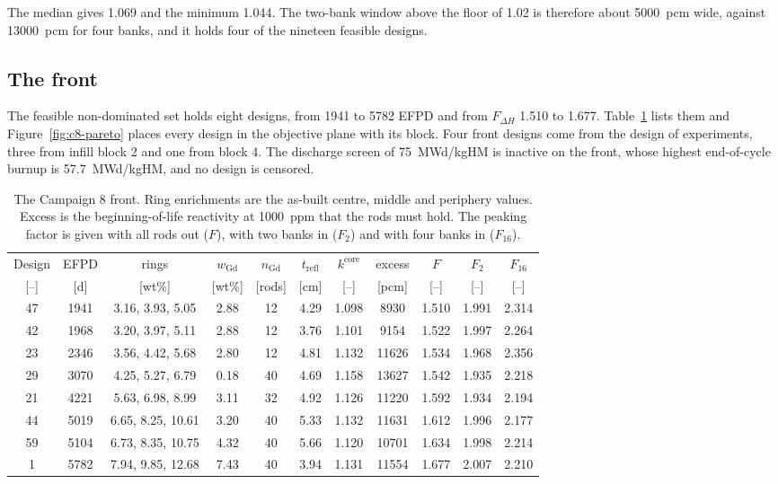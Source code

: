 The median gives 1.069 and the minimum 1.044. The two-bank window
above the floor of 1.02 is therefore about \SI{5000}{pcm} wide, against
\SI{13000}{pcm} for four banks, and it holds four of the nineteen
feasible designs.

\subsection{The front}
\label{sec:res-c8-front}

The feasible non-dominated set holds eight designs, from 1941 to 5782
EFPD and from $F_{\Delta H}$ 1.510 to 1.677. Table~\ref{tab:c8-front}
lists them and Figure~\ref{fig:c8-pareto} places every design in the
objective plane with its block. Four front designs come from the
design of experiments, three from infill block 2 and one from block 4.
The discharge screen of \SI{75}{MWd/kgHM} is inactive on the front,
whose highest end-of-cycle burnup is \SI{57.7}{MWd/kgHM}, and no
design is censored.

\begin{table}[htbp]
  \centering
  \small
  \caption[The Campaign 8 front]{The Campaign 8 front. Ring
  enrichments are the as-built centre, middle and periphery values.
  Excess is the beginning-of-life reactivity at \SI{1000}{ppm} that
  the rods must hold. The peaking factor is given with all rods out
  ($F$), with two banks in ($F_2$) and with four banks in ($F_{16}$).}
  \label{tab:c8-front}
  \setlength{\tabcolsep}{3.4pt}
  \begin{tabular}{ccccccccccc}
    \toprule
    Design & EFPD & rings & $w_\mathrm{Gd}$ & $n_\mathrm{Gd}$ &
      $t_\mathrm{refl}$ & $k^\mathrm{core}$ & excess & $F$ & $F_{2}$ &
      $F_{16}$ \\
    {[--]} & [d] & [wt\%] & [wt\%] & [rods] & [cm] & [--] & [pcm] &
      [--] & [--] & [--] \\
    \midrule
    47 & 1941 & 3.16, 3.93, 5.05  & 2.88 & 12 & 4.29 & 1.098 &  8930 & 1.510 & 1.991 & 2.314 \\
    42 & 1968 & 3.20, 3.97, 5.11  & 2.88 & 12 & 3.76 & 1.101 &  9154 & 1.522 & 1.997 & 2.264 \\
    23 & 2346 & 3.56, 4.42, 5.68  & 2.80 & 12 & 4.81 & 1.132 & 11626 & 1.534 & 1.968 & 2.356 \\
    29 & 3070 & 4.25, 5.27, 6.79  & 0.18 & 40 & 4.69 & 1.158 & 13627 & 1.542 & 1.935 & 2.218 \\
    21 & 4221 & 5.63, 6.98, 8.99  & 3.11 & 32 & 4.92 & 1.126 & 11220 & 1.592 & 1.934 & 2.194 \\
    44 & 5019 & 6.65, 8.25, 10.61 & 3.20 & 40 & 5.33 & 1.132 & 11631 & 1.612 & 1.996 & 2.177 \\
    59 & 5104 & 6.73, 8.35, 10.75 & 4.32 & 40 & 5.66 & 1.120 & 10701 & 1.634 & 1.998 & 2.214 \\
     1 & 5782 & 7.94, 9.85, 12.68 & 7.43 & 40 & 3.94 & 1.131 & 11554 & 1.677 & 2.007 & 2.210 \\
    \bottomrule
  \end{tabular}
\end{table}

